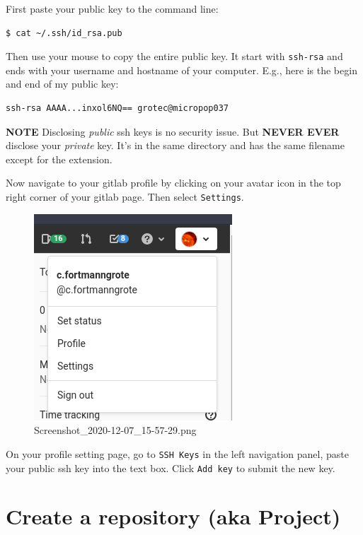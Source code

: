 \documentclass[11pt]{article}
\begin{document}
First paste your public key to the command line:

\begin{verbatim}
$ cat ~/.ssh/id_rsa.pub
\end{verbatim}

Then use your mouse to copy the entire public key. It start with
\texttt{ssh-rsa} and ends with your username and hostname of your
computer. E.g., here is the begin and end of my public key:

\begin{verbatim}
ssh-rsa AAAA...inxol6NQ== grotec@micropop037
\end{verbatim}

\textbf{NOTE} Disclosing \emph{public} ssh keys is no security issue.
But \textbf{NEVER EVER} disclose your \emph{private} key. It's in the
same directory and has the same filename except for the extension.

Now navigate to your gitlab profile by clicking on your avatar icon in
the top right corner of your gitlab page. Then select \texttt{Settings}.

\begin{figure}
\centering
\includegraphics{static/new_repo.png}
\caption{Screenshot\_2020-12-07\_15-57-29.png}
\end{figure}

On your profile setting page, go to \texttt{SSH\ Keys} in the left
navigation panel, paste your public ssh key into the text box. Click
\texttt{Add\ key} to submit the new key.

    \hypertarget{create-a-repository-aka-project}{%
\section{Create a repository (aka
Project)}\label{create-a-repository-aka-project}}
\end{document}
